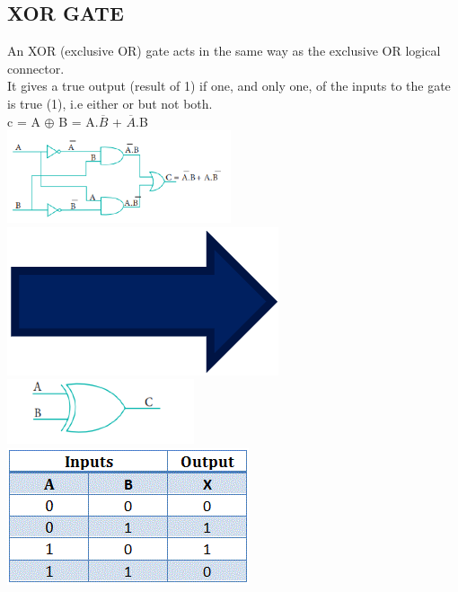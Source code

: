 \documentclass{article}
\begin{document}
\subsection{XOR GATE}
An XOR (exclusive OR) gate acts in the same way as the exclusive OR logical connector. \\
It gives a true output (result of 1) if one, and only one, of the inputs to the gate is true (1), i.e either or but not both.\\
c = A $\oplus$ B = A.$\overline{B}$ + $\overline{A}$.B\\
\includegraphics[width=0.4\linewidth]{8} \includegraphics[width=0.1\linewidth]{Picture 5.1.png} \includegraphics[width=0.4\linewidth]{9}\\
\includegraphics[width=0.5\linewidth]{Unknown-6.png}\\
\newpage
\end{document}
